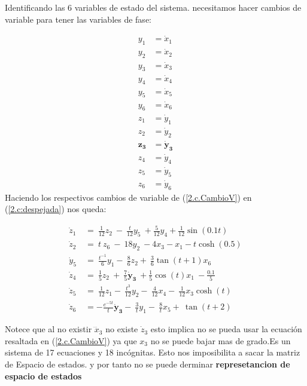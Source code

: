 \documentclass[letterpaper, 12pt]{article}
\begin{document}
\begin{enumerate}
\begin{enumerate}
Identificando las 6 variables de estado del sistema. necesitamos hacer cambios de variable para tener las variables de fase:

\begin{equation}
\begin{split}
    y_1 &= \dot{x}_1 \\
    y_2 &= \dot{x}_2 \\
    y_3 &= \dot{x}_3 \\
    y_4 &= \dot{x}_4 \\
    y_5 &= \dot{x}_5 \\
    y_6 &= \dot{x}_6 \\
    z_1 &= \dot{y}_1 \\
    z_2 &= \dot{y}_2 \\
    \mathbf{z_3} &\mathbf{= \dot{y}_3} \\ %
    z_4 &= \dot{y}_4 \\
    z_5 &= \dot{y}_5 \\
    z_6 &= \dot{y}_6  \label{2.c.CambioV}
\end{split} 
\end{equation}
Haciendo los respectivos cambios de variable de (\ref{2.c.CambioV}) en (\ref{2.c:despejada}) nos queda: 

\begin{equation}
\begin{split}
    {\dot{z}}_1\ &=\ \frac{1}{12}z_2\ -\ \frac{t}{12}y_5\ +\frac{5}{12}y_4+ \frac{1}{12} \sin(0.1t)  \\
    {\dot{z}}_2\ &= \ t\ z_6\ -\ 18y_2\ - 4x_3 - x_1 - t \cosh(0.5) \\
    {\dot{y}}_5\ &=\ \frac{t^{-1}}{6}y_1-\ \frac{8}{6}z_2+\ \frac{3}{6}\tan(t + 1)x_6 \\
    {\dot{z}}_4\ &=\ \frac{1}{5}z_2\ +\ \frac{7}{5}\mathbf{{\dot{y}}_3}\ +\frac{1}{5}\cos(t)x_1\ -\frac{0.1}{5}  \\ 
    {\dot{z}}_5\ &=\ \frac{1}{12}z_1-\ \frac{t^{3}}{12}y_2-\ \frac{4}{12}x_4-\ \frac{1}{12}x_3\cosh(t)  \\
    {\dot{z}}_6\ &= - \frac{e^{-5t}}{t} \mathbf{{\dot{y}}_3}-\ \frac{3}{t}{y}_1-\ \frac{8}{t}x_5+\ \tan(t + 2)
    \label{2.c:remplazada}
\end{split}
\end{equation}

Notece que al no existir $\dddot{x}_3$ no existe $\dot{z}_3$ esto implica no se pueda usar la ecuación resaltada en (\ref{2.c.CambioV}) ya que $x_3$ no se puede bajar mas de grado.Es un sistema de 17 ecuaciones y 18 incógnitas. Esto nos imposibilita a sacar la matriz de Espacio de estados. y por tanto no se puede derminar \textbf{represetancion de espacio de estados}




\end{enumerate}
\end{enumerate}
\end{document}
